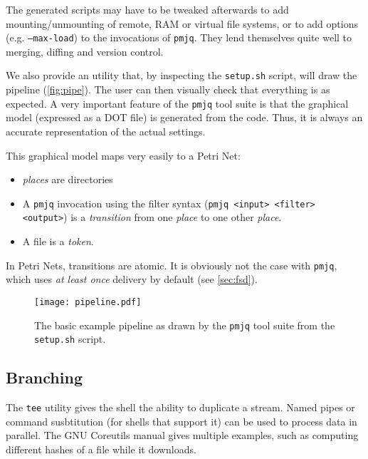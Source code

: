 \documentclass[letterpaper,twocolumn,10pt]{article}
\begin{document}
The generated scripts may have to be tweaked afterwards to add mounting/unmounting of remote, RAM or virtual file systems, or to add options (e.g. {\tt --max-load}) to the invocations of {\tt pmjq}. They lend themselves quite well to merging, diffing and version control.

We also provide an utility that, by inspecting the {\tt setup.sh} script, will draw the pipeline (\autoref{fig:pipe}). The user can then visually check that everything is as expected. A very important feature of the {\tt pmjq} tool suite is that the graphical model (expressed as a DOT file) is generated from the code. Thus, it is always an accurate representation of the actual settings.

This graphical model maps very easily to a Petri Net:
\begin{itemize}
\item \emph{places} are directories
\item A {\tt pmjq} invocation using the filter syntax ({\tt pmjq <input> <filter> <output>}) is a \emph{transition} from one \emph{place} to one other \emph{place}.
\item A file is a \emph{token}.
\end{itemize}

In Petri Nets, transitions are atomic. It is obviously not the case with {\tt pmjq}, which uses \emph{at least once} delivery by default (see \autoref{sec:fsd}).

\begin{figure}[t]
\begin{center}
\texttt{[image: pipeline.pdf]}
\end{center}
\caption{The basic example pipeline as drawn by the {\tt pmjq} tool suite from the {\tt setup.sh} script.}
\label{fig:pipe}
\end{figure}

\subsection{Branching}

The {\tt tee} utility gives the shell the ability to duplicate a stream. Named pipes or command susbtitution (for shells that support it) can be used to process data in parallel. The GNU Coreutils manual gives multiple examples, such as computing different hashes of a file while it downloads.
\end{document}
